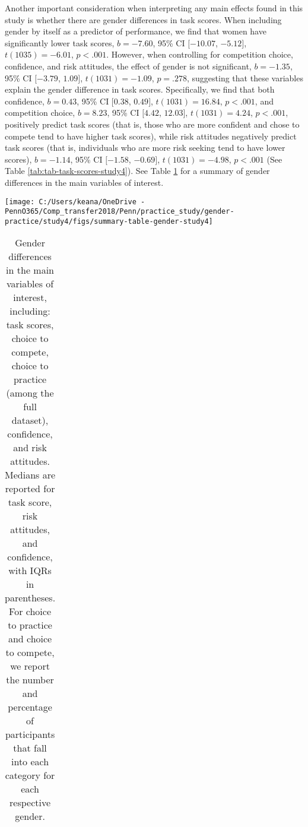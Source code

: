 \documentclass[letterpaper, nobind]{templates/ociamthesis}
\begin{document}
Another important consideration when interpreting any main effects found in this study is whether there are gender differences in task scores. When including gender by itself as a predictor of performance, we find that women have significantly lower task scores, \(b = -7.60\), 95\% CI \([-10.07\), \(-5.12]\), \(t(1035) = -6.01\), \(p < .001\). However, when controlling for competition choice, confidence, and risk attitudes, the effect of gender is not significant, \(b = -1.35\), 95\% CI \([-3.79\), \(1.09]\), \(t(1031) = -1.09\), \(p = .278\), suggesting that these variables explain the gender difference in task scores. Specifically, we find that both confidence, \(b = 0.43\), 95\% CI \([0.38\), \(0.49]\), \(t(1031) = 16.84\), \(p < .001\), and competition choice, \(b = 8.23\), 95\% CI \([4.42\), \(12.03]\), \(t(1031) = 4.24\), \(p < .001\), positively predict task scores (that is, those who are more confident and chose to compete tend to have higher task scores), while risk attitudes negatively predict task scores (that is, individuals who are more risk seeking tend to have lower scores), \(b = -1.14\), 95\% CI \([-1.58\), \(-0.69]\), \(t(1031) = -4.98\), \(p < .001\) (See Table \ref{tab:tab-task-scores-study4}). See Table \ref{tab:summary-table-gender-study4} for a summary of gender differences in the main variables of interest.

\begin{center}\texttt{[image: C:/Users/keana/OneDrive - PennO365/Comp\_transfer2018/Penn/practice\_study/gender-practice/study4/figs/summary-table-gender-study4]} \end{center}

\begin{table}[ht]
\centering
\begingroup\fontsize{0.1pt}{0.1pt}\selectfont
\begin{tabular}{r}
   \\ 
 \end{tabular}
\endgroup
\caption{Gender differences in the main variables of interest, including: task scores, choice to compete, choice to practice (among the full dataset), confidence, and risk attitudes. Medians are reported for task score, risk attitudes, and confidence, with IQRs in parentheses. For choice to practice and choice to compete, we report the number and percentage of participants that fall into each category for each respective gender.} 
\label{tab:summary-table-gender-study4}
\end{table}

\newpage
\end{document}
